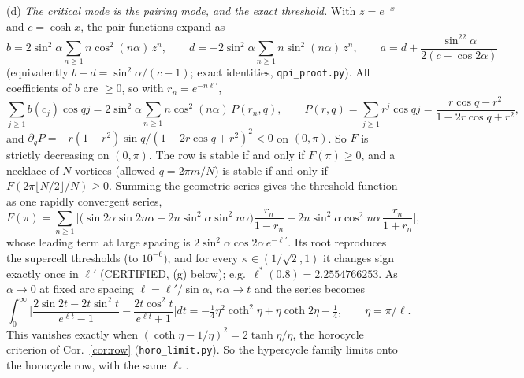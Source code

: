 \documentclass[11pt]{article}
\theoremstyle{remark}
\begin{document}
(d) \emph{The critical mode is the pairing mode, and the exact threshold.} With $z=e^{-x}$ and $c=\cosh x$, the pair
functions expand as
\[
b=2\sin^2\!\alpha\sum_{n\ge1}n\cos^2(n\alpha)\,z^n,\qquad d=-2\sin^2\!\alpha\sum_{n\ge1}n\sin^2(n\alpha)\,z^n,\qquad
a=d+\frac{\sin^22\alpha}{2(c-\cos2\alpha)}
\]
(equivalently $b-d=\sin^2\alpha/(c-1)$; exact identities, \texttt{qpi\_proof.py}). All coefficients of $b$ are $\ge0$, so with
$r_n=e^{-n\ell'}$,
\[
\sum_{j\ge1}b(c_j)\cos qj=2\sin^2\!\alpha\sum_{n\ge1}n\cos^2(n\alpha)\,P(r_n,q),\qquad
P(r,q)=\sum_{j\ge1}r^j\cos qj=\frac{r\cos q-r^2}{1-2r\cos q+r^2},
\]
and $\partial_qP=-r(1-r^2)\sin q/(1-2r\cos q+r^2)^2<0$ on $(0,\pi)$. So $F$ is strictly decreasing on $(0,\pi)$. The row is
stable if and only if $F(\pi)\ge0$, and a necklace of $N$ vortices (allowed $q=2\pi m/N$) is stable if and only if
$F(2\pi\lfloor N/2\rfloor/N)\ge0$. Summing the geometric series gives the threshold function as one rapidly convergent series,
\[
F(\pi)=\sum_{n\ge1}\Big[\big(\sin2\alpha\sin2n\alpha-2n\sin^2\!\alpha\sin^2n\alpha\big)\frac{r_n}{1-r_n}
-2n\sin^2\!\alpha\cos^2n\alpha\,\frac{r_n}{1+r_n}\Big],
\]
whose leading term at large spacing is $2\sin^2\!\alpha\cos2\alpha\,e^{-\ell'}$. Its root reproduces the supercell thresholds (to $10^{-6}$), and
for every $\kappa\in(1/\sqrt2,1)$ it changes sign exactly once in $\ell'$ (CERTIFIED, (g) below); e.g.\ $\ell^*(0.8)=2.2554766253$. As $\alpha\to0$
at fixed arc spacing $\ell=\ell'/\sin\alpha$, $n\alpha\to t$ and the series becomes
\[
\int_0^\infty\Big[\frac{2\sin2t-2t\sin^2t}{e^{\ell t}-1}-\frac{2t\cos^2t}{e^{\ell t}+1}\Big]dt
=-\tfrac14\eta^2\coth^2\eta+\eta\coth2\eta-\tfrac14,\qquad \eta=\pi/\ell .
\]
This vanishes exactly when $(\coth\eta-1/\eta)^2=2\tanh\eta/\eta$, the horocycle criterion of
Cor.~\ref{cor:row} (\texttt{horo\_limit.py}). So the hypercycle family limits onto the horocycle row, with the same $\ell_*$.
\end{document}
